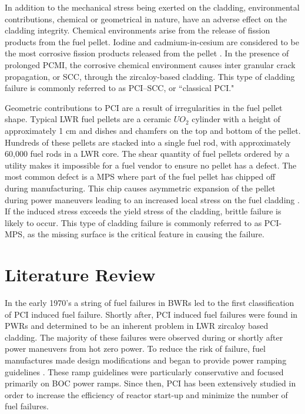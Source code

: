 \documentclass[edeposit,fullpage,11pt]{uiucthesis2009}
\begin{document}
In addition to the mechanical stress being exerted on the cladding, environmental contributions, chemical or geometrical in nature, have an adverse effect on the cladding integrity.
Chemical environments arise from the release of fission products from the fuel pellet.
Iodine and cadmium-in-cesium are considered to be the most corrosive fission products released from the pellet \cite{capps_evaluation_2016}. 
In the presence of prolonged \gls{PCMI}, the corrosive chemical environment causes inter granular crack propagation, or \gls{SCC}, through the zircaloy-based cladding.
This type of cladding failure is commonly referred to as \gls{PCI}--\gls{SCC}, or ``classical \gls{PCI}."

Geometric contributions to \gls{PCI} are a result of irregularities in the fuel pellet shape.
Typical \gls{LWR} fuel pellets are a ceramic $UO_2$ cylinder with a height of approximately 1 cm and dishes and chamfers on the top and bottom of the pellet.
Hundreds of these pellets are stacked into a single fuel rod, with approximately 60,000 fuel rods in a \gls{LWR} core.
The shear quantity of fuel pellets ordered by a utility makes it impossible for a fuel vendor to ensure no pellet has a defect.
The most common defect is a \gls{MPS} where part of the fuel pellet has chipped off during manufacturing.
This chip causes asymmetric expansion of the pellet during power maneuvers leading to an increased local stress on the fuel cladding \cite{capps_evaluation_2016}. 
If the induced stress exceeds the yield stress of the cladding, brittle failure is likely to occur.
This type of cladding failure is commonly referred to as \gls{PCI}-\gls{MPS}, as the missing surface is the critical feature in causing the failure.


\section{Literature Review}

In the early 1970's a string of fuel failures in \gls{BWR}s led to the first classification of \gls{PCI} induced fuel failure.  
Shortly after, \gls{PCI} induced fuel failures were found in \gls{PWR}s and determined to be an inherent problem in \gls{LWR} zircaloy based cladding. 
The majority of these failures were observed during or shortly after power maneuvers from hot zero power.
To reduce the risk of failure, fuel manufactures made design modifications and began to provide power ramping guidelines \cite{kennard_pci_2016}.
These ramp guidelines were particularly conservative and focused primarily on \gls{BOC} power ramps. 
Since then, \gls{PCI} has been extensively studied in order to increase the efficiency of reactor start-up and minimize the number of fuel failures.
 
\end{document}
